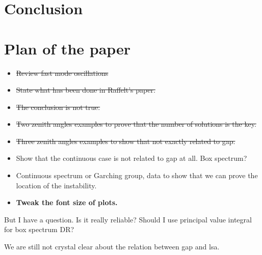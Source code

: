 \documentclass[%
preprint,
 amsmath,amssymb,
 aps,
 prd
]{revtex4-1}
\begin{document}
\section{\label{sec-conclusion}Conclusion}























\appendix
\section{\label{sec-outline}Plan of the paper}



\begin{itemize}
    \item \sout{Review fast mode oscillations}
    \item \sout{State what has been done in Raffelt's paper.}
    \item \sout{The conclusion is not true.}
    \item \sout{Two zenith angles examples to prove that the number of solutions is the key.}
    \item \sout{Three zenith angles examples to show that not exactly related to gap.}
    \item Show that the continuous case is not related to gap at all. Box spectrum?
    \item Continuous spectrum or Garching group, data to show that we can prove the location of the instability.
    \item {\color{red}\bf Tweak the font size of plots.}
\end{itemize}


But I have a question. Is it really reliable? Should I use principal value integral for box spectrum DR?

We are still not crystal clear about the relation between gap and lsa.







\end{document}
